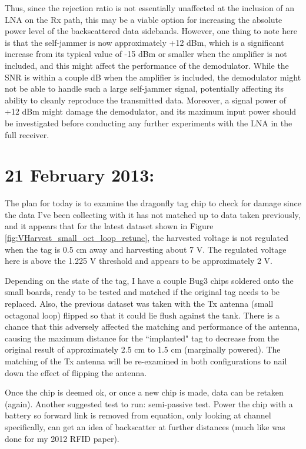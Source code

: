 \documentclass[12pt,onecolumn,titlepage]{article}
\begin{document}
Thus, since the rejection ratio is not essentially unaffected at the inclusion of an LNA on the Rx path, this may be a viable option for increasing the absolute power level of the backscattered data sidebands. However, one thing to note here is that the self-jammer is now approximately +12 dBm, which is a significant increase from its typical value of -15 dBm or smaller when the amplifier is not included, and this might affect the performance of the demodulator. While the SNR is within a couple dB when the amplifier is included, the demodulator might not be able to handle such a large self-jammer signal, potentially affecting its ability to cleanly reproduce the transmitted data. Moreover, a signal power of +12 dBm might damage the demodulator, and its maximum input power should be investigated before conducting any further experiments with the LNA in the full receiver.


\clearpage
\section{21 February 2013:}

\indent \indent The plan for today is to examine the dragonfly tag chip to check for damage since the data I've been collecting with it has not matched up to data taken previously, and it appears that for the latest dataset shown in Figure \ref{fig:VHarvest_small_oct_loop_retune}, the harvested voltage is not regulated when the tag is 0.5 cm away and harvesting about 7 V. The regulated voltage here is above the 1.225 V threshold and appears to be approximately 2 V. 

Depending on the state of the tag, I have a couple Bug3 chips soldered onto the small boards, ready to be tested and matched if the original tag needs to be replaced. Also, the previous dataset was taken with the Tx antenna (small octagonal loop) flipped so that it could lie flush against the tank. There is a chance that this adversely affected the matching and performance of the antenna, causing the maximum distance for the ``implanted" tag to decrease from the original result of approximately 2.5 cm to 1.5 cm (marginally powered). The matching of the Tx antenna will be re-examined in both configurations to nail down the effect of flipping the antenna.

Once the chip is deemed ok, or once a new chip is made, data can be retaken (again). Another suggested test to run: semi-passive test. Power the chip with a battery so forward link is removed from equation, only looking at channel specifically, can get an idea of backscatter at further distances (much like was done for my 2012 RFID paper). 
\end{document}
